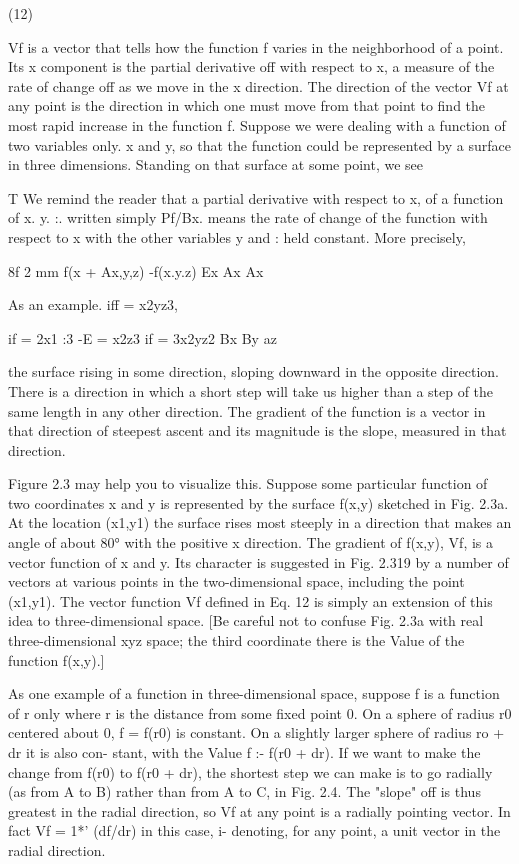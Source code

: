 (12)

 

Vf is a vector that tells how the function f varies in the neighborhood
of a point. Its x component is the partial derivative off with respect
to x, a measure of the rate of change off as we move in the x direction.
The direction of the vector Vf at any point is the direction in which
one must move from that point to find the most rapid increase in the
function f. Suppose we were dealing with a function of two variables
only. x and y, so that the function could be represented by a surface
in three dimensions. Standing on that surface at some point, we see

T We remind the reader that a partial derivative with respect to x, of a function of
x. y. :. written simply Pf/Bx. means the rate of change of the function with respect to x
with the other variables y and : held constant. More precisely,

8f 2 mm f(x + Ax,y,z) -f(x.y.z)
Ex Ax Ax

As an example. iff = x2yz3,

if = 2x1 :3 -E = x2z3 if = 3x2yz2
Bx By az

the surface rising in some direction, sloping downward in the opposite
direction. There is a direction in which a short step will take us
higher than a step of the same length in any other direction. The
gradient of the function is a vector in that direction of steepest ascent
and its magnitude is the slope, measured in that direction.

Figure 2.3 may help you to visualize this. Suppose some particular
function of two coordinates x and y is represented by the surface
f(x,y) sketched in Fig. 2.3a. At the location (x1,y1) the surface rises
most steeply in a direction that makes an angle of about 80° with the
positive x direction. The gradient of f(x,y), Vf, is a vector function
of x and y. Its character is suggested in Fig. 2.319 by a number of
vectors at various points in the two-dimensional space, including the
point (x1,y1). The vector function Vf defined in Eq. 12 is simply an
extension of this idea to three-dimensional space. [Be careful not to
confuse Fig. 2.3a with real three-dimensional xyz space; the third
coordinate there is the Value of the function f(x,y).]

As one example of a function in three-dimensional space, suppose
f is a function of r only where r is the distance from some fixed
point 0. On a sphere of radius r0 centered about 0, f = f(r0) is
constant. On a slightly larger sphere of radius ro + dr it is also con-
stant, with the Value f :- f(r0 + dr). If we want to make the change
from f(r0) to f(r0 + dr), the shortest step we can make is to go
radially (as from A to B) rather than from A to C, in Fig. 2.4. The
"slope" off is thus greatest in the radial direction, so Vf at any point
is a radially pointing vector. In fact Vf = 1*' (df/dr) in this case,
i- denoting, for any point, a unit vector in the radial direction.

